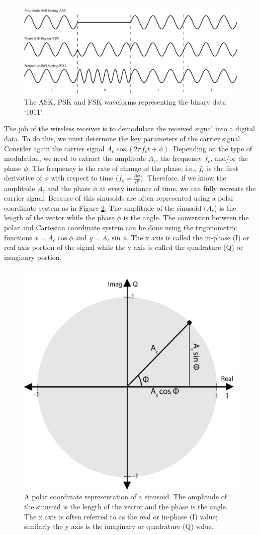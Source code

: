 \begin{figure}
\centering
%
\includegraphics[width=.9\textwidth]{images/keying}
\caption{The ASK, PSK and FSK waveforms representing the binary data `1011'.}
\label{fig:keying}
\end{figure}

The job of the wireless receiver is to demodulate the received signal into a digital data. To do this, we must determine the key parameters of the carrier signal. Consider again the carrier signal $A_c \cos (2 \pi f_c t + \phi)$. Depending on the type of modulation, we need to extract the amplitude $A_c$, the frequency $f_c$, and/or the phase $\phi$. The frequency is the rate of change of the phase, i.e., $f_c$ is the first derivative of $\phi$ with respect to time ($f_c = \frac{\partial \phi}{\partial t}$). Therefore, if we know the amplitude $A_c$ and the phase $\phi$ at every instance of time, we can fully recreate the carrier signal. Because of this sinusoids are often represented using a polar coordinate system as in Figure \ref{fig:polar}. The amplitude of the sinusoid ($A_c$) is the length of the vector while the phase $\phi$ is the angle. The conversion between the polar and Cartesian coordinate system can be done using the trigonometric functions $x = A_c \cos \phi$ and $y = A_c \sin \phi$. The x axis is called the in-phase (I) or real axis portion of the signal while the y axis is called the quadrature (Q) or imaginary portion. 

\begin{figure}
\centering
%
\includegraphics[width=.5\textwidth]{images/polar}
\caption{A polar coordinate representation of a sinusoid. The amplitude of the sinusoid is the length of the vector and the phase is the angle. The x axis is often referred to as the real or in-phase (I) value; similarly the y axis is the imaginary or quadrature (Q) value. }
\label{fig:polar}
\end{figure}

